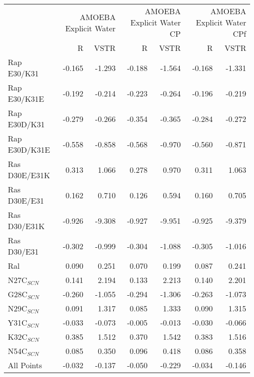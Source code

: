 \documentclass[]{article}
\begin{document}
{
\begin{tabular}{ l || r r| r r| r r}
 & \multicolumn{2}{|C{2cm}}{AMOEBA Explicit Water} & \multicolumn{2}{|C{2cm}}{AMOEBA Explicit Water CP} & \multicolumn{2}{|C{2cm}}{AMOEBA Explicit Water CPf} \\
 & \multicolumn{1}{|C{1cm}}{R} & \multicolumn{1}{C{1cm}}{VSTR} & \multicolumn{1}{|C{1cm}}{R} & \multicolumn{1}{C{1cm}}{VSTR} & \multicolumn{1}{|C{1cm}}{R} & \multicolumn{1}{C{1cm}}{VSTR} \\
\hline\hline
Rap E30/K31    & -0.165         & -1.293         & -0.188         & -1.564         & -0.168         & -1.331        \\
Rap E30/K31E   & -0.192         & -0.214         & -0.223         & -0.264         & -0.196         & -0.219        \\
Rap E30D/K31   & -0.279         & -0.266         & -0.354         & -0.365         & -0.284         & -0.272        \\
Rap E30D/K31E  & -0.558         & -0.858         & -0.568         & -0.970         & -0.560         & -0.871        \\
Ras D30E/E31K  & 0.313          & 1.066          & 0.278          & 0.970          & 0.311          & 1.063         \\
Ras D30E/E31   & 0.162          & 0.710          & 0.126          & 0.594          & 0.160          & 0.705         \\
Ras D30/E31K   & -0.926         & -9.308         & -0.927         & -9.951         & -0.925         & -9.379        \\
Ras D30/E31    & -0.302         & -0.999         & -0.304         & -1.088         & -0.305         & -1.016        \\
Ral            & 0.090          & 0.251          & 0.070          & 0.199          & 0.087          & 0.241         \\
\hline
N27C$_{SCN}$   & 0.141          & 2.194          & 0.133          & 2.213          & 0.140          & 2.201         \\
G28C$_{SCN}$   & -0.260         & -1.055         & -0.294         & -1.306         & -0.263         & -1.073        \\
N29C$_{SCN}$   & 0.091          & 1.317          & 0.085          & 1.333          & 0.090          & 1.315         \\
Y31C$_{SCN}$   & -0.033         & -0.073         & -0.005         & -0.013         & -0.030         & -0.066        \\
K32C$_{SCN}$   & 0.385          & 1.512          & 0.370          & 1.542          & 0.383          & 1.516         \\
N54C$_{SCN}$   & 0.085          & 0.350          & 0.096          & 0.418          & 0.086          & 0.358         \\
\hline
All Points     & -0.032         & -0.137         & -0.050         & -0.229         & -0.034         & -0.146        \\
\end{tabular}\\
}\\
\end{document}
